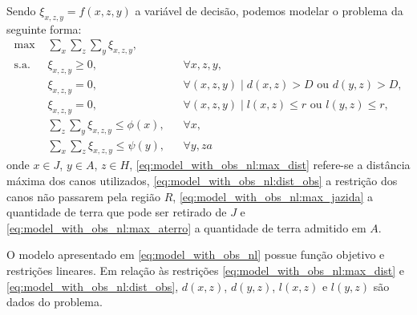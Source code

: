 Sendo $\xi_{x, z, y} = f(x, z, y)$ a variável de decisão, podemos modelar o
problema da seguinte forma:
\begin{subequations}
    \begin{align}
        \text{max } & \sum_{x} \sum_{z} \sum_{y} \xi_{x, z, y},
        \label{eq:model_with_obs_nl:obj_func} \\
        \text{s.a. } & \xi_{x, z, y} \geq 0, && \forall x, z, y,
        \label{eq:model_with_obs_nl:var} \\
        & \xi_{x, z, y} = 0, && \forall (x, z, y) \mid d(x, z) > D \text{ ou } 
        d(y, z) > D,
        \label{eq:model_with_obs_nl:max_dist} \\
        & \xi_{x, z, y} = 0, && \forall (x, z, y) \mid l(x, z) \leq r \text{ ou }
        l(y, z) \leq r,
        \label{eq:model_with_obs_nl:dist_obs} \\
        & \sum_{z} \sum_{y} \xi_{x, z, y} \leq \phi(x), && \forall x,
        \label{eq:model_with_obs_nl:max_jazida} \\
        & \sum_{x} \sum_{z} \xi_{x, z, y} \leq \psi(y), && \forall y,
        \label{eq:model_with_obs_nl:max_aterro}
  za  \end{align}
    \label{eq:model_with_obs_nl}
\end{subequations}
onde $x \in J$, $y \in A$, $z \in H$, \eqref{eq:model_with_obs_nl:max_dist}
refere-se a distância máxima dos canos utilizados,
\eqref{eq:model_with_obs_nl:dist_obs} a restrição dos canos não passarem pela
região $R$, \eqref{eq:model_with_obs_nl:max_jazida} a quantidade de terra que pode
ser retirado de $J$ e \eqref{eq:model_with_obs_nl:max_aterro} a quantidade de terra
admitido em $A$.

O modelo apresentado em \eqref{eq:model_with_obs_nl} possue função objetivo e
restrições lineares. Em relação \`{a}s restrições
\eqref{eq:model_with_obs_nl:max_dist} e \eqref{eq:model_with_obs_nl:dist_obs},
$d(x, z)$, $d(y, z)$, $l(x, z)$ e $l(y, z)$ são dados do problema.
